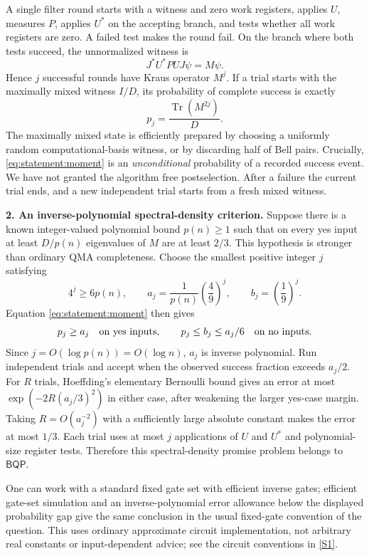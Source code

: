 \documentclass[11pt,a4paper]{article}
\newcommand{\sref}[2]{\hyperlink{source:#1:#2}{[S#2]}}
\numberwithin{equation}{section}
\begin{document}
A single filter round starts with a witness and zero work registers,
applies $U$, measures $P$, applies $U^*$ on the accepting branch, and tests
whether all work registers are zero. A failed test makes the round fail.
On the branch where both tests succeed, the unnormalized witness is
\[
 J^*U^*PUJ\psi=M\psi.
\]
Hence $j$ successful rounds have Kraus operator $M^j$. If a trial starts
with the maximally mixed witness $I/D$, its probability of complete success
is exactly
\begin{equation}\label{eq:statement:moment}
 p_j=\frac{\operatorname{Tr}(M^{2j})}{D}.
\end{equation}
The maximally mixed state is efficiently prepared by choosing a uniformly
random computational-basis witness, or by discarding half of Bell pairs.
Crucially, \eqref{eq:statement:moment} is an \emph{unconditional} probability of a
recorded success event. We have not granted the algorithm free postselection.
After a failure the current trial ends, and a new independent trial starts
from a fresh mixed witness.

\textbf{2. An inverse-polynomial spectral-density criterion.}
Suppose there is a known integer-valued polynomial bound $p(n)\ge1$ such
that on every yes input at least $D/p(n)$ eigenvalues of $M$ are at least
$2/3$. This hypothesis is stronger than ordinary QMA completeness.
Choose the smallest positive integer $j$ satisfying
\[
 4^j\ge6p(n),\qquad
 a_j=\frac1{p(n)}\left(\frac49\right)^j,\qquad
 b_j=\left(\frac19\right)^j.
\]
Equation \eqref{eq:statement:moment} then gives
\[
 p_j\ge a_j\quad\hbox{on yes inputs},\qquad
 p_j\le b_j\le a_j/6\quad\hbox{on no inputs}.
\]
Since $j=O(\log p(n))=O(\log n)$, $a_j$ is inverse polynomial.
Run independent trials and accept when the observed success fraction
exceeds $a_j/2$. For $R$ trials, Hoeffding's elementary Bernoulli bound gives
an error at most $\exp(-2R(a_j/3)^2)$ in either case, after weakening the
larger yes-case margin. Taking $R=O(a_j^{-2})$ with a sufficiently large
absolute constant makes the error at most $1/3$. Each trial uses at most
$j$ applications of $U$ and $U^*$ and polynomial-size register tests.
Therefore this spectral-density promise problem belongs to $\mathsf{BQP}$.

One can work with a standard fixed gate set with efficient inverse gates;
efficient gate-set simulation and an inverse-polynomial error allowance
below the displayed probability gap give the same conclusion in the usual
fixed-gate convention of the question. This uses ordinary approximate
circuit implementation, not arbitrary real constants or input-dependent
advice; see the circuit conventions in \sref{statement}{1}.
\end{document}
